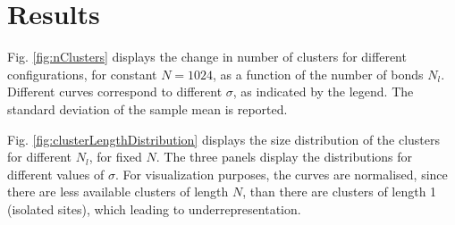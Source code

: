 \section{Results}

%
%
%


Fig. \ref{fig:nClusters} displays the change in number of clusters for different configurations, for constant $N=1024$, as a function of the number of bonds $N_l.$ Different curves correspond to different  $\sigma$, as indicated by the legend. The standard deviation of the sample mean is reported.

Fig. \ref{fig:clusterLengthDistribution} displays the size distribution of the clusters for different $N_l$, for fixed $N.$ The three panels display the distributions for different values of  $\sigma.$ For visualization purposes, the curves are normalised, since there are less available clusters of length  $N$,  than there are clusters of length 1 (isolated sites), which leading to underrepresentation. 

